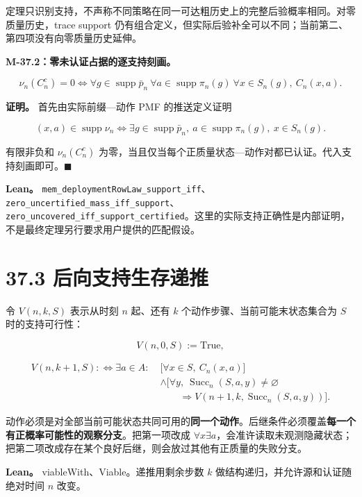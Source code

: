 \documentclass[
  11pt,
  oneside]{book}
\begin{document}
定理只识别支持，不声称不同策略在同一可达粗历史上的完整后验概率相同。对零质量历史，trace support 仍有组合定义，但实际后验补全可以不同；当前第二、第四项没有向零质量历史延伸。

\hypertarget{m-37-2}{}\label{m-37-2}

\textbf{M-37.2：零未认证占据的逐支持刻画。}

\[\nu_n(C_n^c)=0
\iff
\forall g\in\operatorname{supp}\bar p_n\
\forall a\in\operatorname{supp}\pi_n(g)\
\forall x\in S_n(g),\ C_n(x,a).\]

\textbf{证明。} 首先由实际前缀---动作 PMF 的推送定义证明

\[(x,a)\in\operatorname{supp}\nu_n
\iff
\exists g\in\operatorname{supp}\bar p_n,\
a\in\operatorname{supp}\pi_n(g),\ x\in S_n(g).\]

有限非负和 \(\nu_n(C_n^c)\) 为零，当且仅当每个正质量状态---动作对都已认证。代入支持刻画即可。\(\blacksquare\)

\textbf{Lean。} \nolinkurl{mem_deploymentRowLaw_support_iff}、\nolinkurl{zero_uncertified_mass_iff_support}、\nolinkurl{zero_uncovered_iff_support_certified}。这里的实际支持正确性是内部证明，不是最终定理另行要求用户提供的匹配假设。

\section{37.3 后向支持生存递推}\label{ux540eux5411ux652fux6301ux751fux5b58ux9012ux63a8}

令 \(V(n,k,S)\) 表示从时刻 \(n\) 起、还有 \(k\) 个动作步骤、当前可能末状态集合为 \(S\) 时的支持可行性：

\[V(n,0,S):=\mathrm{True},\]

\[\begin{aligned}
V(n,k+1,S):\iff \exists a\in A:\;&
\bigl[\forall x\in S,\ C_n(x,a)\bigr]\\
&\land
\bigl[\forall y,\ \operatorname{Succ}_n(S,a,y)\ne\varnothing
\\
&\qquad \Rightarrow V(n+1,k,\operatorname{Succ}_n(S,a,y))\bigr].
\end{aligned}\]

动作必须是对全部当前可能状态共同可用的\textbf{同一个动作}。后继条件必须覆盖\textbf{每一个有正概率可能性的观察分支}。把第一项改成 \(\forall x\exists a\)，会准许读取未观测隐藏状态；把第二项改成存在某个良好后继，则会放过其他有正质量的失败分支。

\textbf{Lean。} viableWith、Viable。递推用剩余步数 \(k\) 做结构递归，并允许源和认证随绝对时间 \(n\) 改变。
\end{document}
